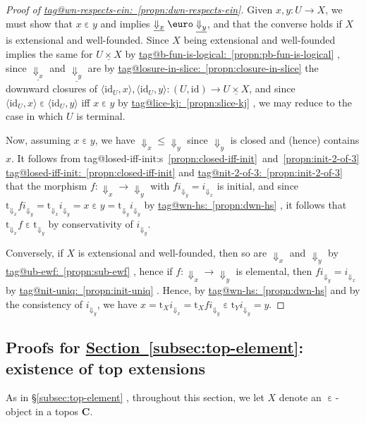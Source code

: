 \documentclass{amsart}
\makeatletter
\newcommand\alttext{\texorpdfstring}
\newcommand\bC{\mathbf{C}}
\newcommand\br[1]{\langle{}#1\rangle{}}
\newcommand\Dwn{{\Downarrow}}
\newcommand\Ein{\mathrel{\text{\textup{\euro}}}}
\newcommand\ein{\mathrel{\varepsilon}}
\newcommand\id{\mathrm{id}}
\newcommand\rt{\mathrm{t}}
\newcommand\und[1]{\underline{#1}}
\newcommand\unein{{\ein}}
\newcommand\tagword[1]{\csname tag@#1\endcsname}
\def\label@tag#1:#2\@nil{#1}
\newcommand\labeltag[1]{\label@tag#1:\@nil}
\newcommand\jref[1]{%
  \texorpdfstring%
    {\hyperref[#1]{\tagword{\labeltag{#1}}~\ref*{#1}}}%
    {\tagword{\labeltag{#1}}~\ref*{#1}}%
}
\newcommand\jrefs[2]{%
  \ifthenelse{\equal{\labeltag{#1}}{\labeltag{#2}}}%
  {%
    \texorpdfstring%
      {\tagword{\labeltag{#1}}s~\ref{#1}~and~\ref{#2}}%
      {\tagword{\labeltag{#1}}s~\ref*{#1}~and~\ref*{#2}}%
  }{\jref{#1} and \jref{#2}}%
}
\newcommand\prerefpost[3]{%
  \texorpdfstring%
    {\hyperref[#2]{#1\ref*{#2}#3}}%
    {#1\ref*{#2}#3}%
}
\newcommand\sref[1]{\prerefpost{\S}{#1}{}}
\theoremstyle{definition}
\theoremstyle{remark}
\theoremstyle{plainwithref}
\makeatother
\begin{document}
\begin{proof}[Proof of \jref{propn:dwn-respects-ein}] \label{proof:dwn-respects-ein}
  Given \( x,y \colon U \to X \), we must show that \( x \ein y \) and implies \( \und{\Dwn_x} \Ein \und{\Dwn_y} \), and that the converse holds if \( X \) is extensional and well-founded.
  Since \( X \) being extensional and well-founded implies the same for \( \und{U \times X} \) by \jref{propn:pb-fun-is-logical}, since \( \und{\Dwn_x} \) and \( \und{\Dwn_y} \) are by \jref{propn:closure-in-slice} the downward closures of \( \br{\id_U,x}, \br{\id_U,y} \colon (U, \id) \to \und{U \times X} \), and since \( \br{\id_U, x} \ein \br{\id_U, y} \) iff \( x \ein y \) by \jref{propn:slice-kj}, we may reduce to the case in which \( U \) is terminal.

  Now, assuming \( x \ein y \), we have \( \Dwn_x \le \Dwn_y \) since \( \Dwn_y \) is closed and (hence) contains \( x \).
  It follows from \jrefs{propn:closed-iff-init}{propn:init-2-of-3} that the morphism \( f \colon \Dwn_x \to \Dwn_y \) with \( f i_{\Dwn_y} = i_{\Dwn_x} \) is initial, and since \( \rt_{\Dwn_x} f i_{\Dwn_y} = \rt_{\Dwn_x} i_{\Dwn_y} = x \ein y = \rt_{\Dwn_y} i_{\Dwn_y} \) by \jref{propn:dwn-hs}, it follows that \( \rt_{\Dwn_x} f \ein \rt_{\Dwn_y} \) by conservativity of \( i_{\Dwn_y} \).

  Conversely, if \( X \) is extensional and well-founded, then so are \( \Dwn_x \) and \( \Dwn_y \) by \jref{propn:sub-ewf}, hence if \( f \colon \Dwn_x \to \Dwn_y \) is elemental, then \( f i_{\Dwn_y} = i_{\Dwn_x} \) by \jref{propn:init-uniq}.
  Hence, by \jref{propn:dwn-hs} and by the consistency of \( i_{\Dwn_y} \), we have \( x = \rt_X i_{\Dwn_x} = \rt_X f i_{\Dwn_y} \ein \rt_Y i_{\Dwn_y} = y \).
\end{proof}

\subsection{Proofs for \alttext{\hyperref[subsec:top-element]{Section~\ref*{subsec:top-element}}}{Section~\ref*{subsec:top-element}}: existence of top extensions} \label{subsec:top-element-proofs}
As in \sref{subsec:top-element}, throughout this section, we let \( X \) denote an \( \unein \)-object in a topos \( \bC \).
\end{document}
